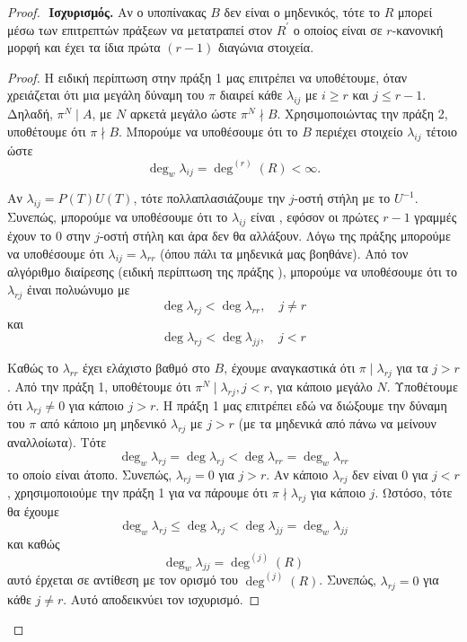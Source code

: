 \begin{proof}
$ $\newline
\textbf{Ισχυρισμός.} Αν ο υποπίνακας $B$ δεν είναι ο μηδενικός, τότε το $R$ μπορεί μέσω των επιτρεπτών πράξεων να μετατραπεί στον $R^\prime$ ο οποίος είναι σε $r$-κανονική μορφή και έχει τα ίδια πρώτα $(r-1)$ διαγώνια στοιχεία.
\begin{proof}
    Η ειδική περίπτωση στην πράξη 1 μας επιτρέπει να υποθέτουμε, όταν χρειάζεται ότι μια μεγάλη δύναμη του $\pi$ διαιρεί κάθε $\lambda_{ij}$ με $i\geq r$ και $j\leq r-1$. Δηλαδή, $\pi^N \mid A$, με $N$ αρκετά μεγάλο ώστε $\pi^N\nmid B$. Χρησιμοποιώντας την πράξη 2, υποθέτουμε ότι $\pi \nmid B$. Μπορούμε να υποθέσουμε ότι το $B$ περιέχει στοιχείο $\lambda_{ij}$ τέτοιο ώστε
    $$\deg_w \lambda_{ij} = \deg^{(r)}(R)<\infty .$$

    \noindent Αν $\lambda_{ij} = P(T)U(T)$, τότε πολλαπλασιάζουμε την $j$-οστή στήλη με το $U^{-1}$. Συνεπώς, μπορούμε να υποθέσουμε ότι το $\lambda_{ij}$ είναι , εφόσον οι πρώτες $r-1$ γραμμές έχουν το 0 στην $j$-οστή στήλη και άρα δεν θα αλλάξουν. Λόγω της πράξης  μπορούμε να υποθέσουμε ότι $\lambda_{ij}  = \lambda_{rr}$ (όπου πάλι τα μηδενικά μας βοηθάνε). Από τον αλγόριθμο διαίρεσης (ειδική περίπτωση της πράξης ), μπορούμε να υποθέσουμε ότι το $\lambda_{rj}$ έιναι πολυώνυμο με
    $$\deg \lambda_{rj} < \deg \lambda_{rr}, \quad j\neq r$$ και 
    $$\deg \lambda_{rj} < \deg \lambda_{jj}, \quad j < r$$

    \noindent Καθώς το $\lambda_{rr}$ έχει ελάχιστο βαθμό  στο $B$, έχουμε αναγκαστικά ότι $\pi \mid \lambda_{rj}$ για τα $j > r$. Από την πράξη 1, υποθέτουμε ότι $\pi^N \mid \lambda_{rj}, j<r$, για κάποιο μεγάλο $N$. Υποθέτουμε ότι $\lambda_{rj} \neq 0$ για κάποιο $j > r$. Η πράξη 1 μας επιτρέπει εδώ να διώξουμε την δύναμη του $\pi$ από κάποιο μη μηδενικό $\lambda_{rj}$ με $j>r$ (με τα μηδενικά από πάνω να μείνουν αναλλοίωτα). Τότε 
    $$\deg_w \lambda_{rj} = \deg \lambda_{rj} < \deg \lambda_{rr} = \deg_w \lambda_{rr}$$ το οποίο είναι άτοπο. Συνεπώς, $\lambda_{rj} = 0$ για $j>r$. Αν κάποιο $\lambda_{rj}$ δεν είναι $0$ για $j<r$, χρησιμοποιούμε την πράξη 1 για να πάρουμε ότι $\pi \nmid \lambda_{rj}$ για κάποιο $j$. Ωστόσο, τότε θα έχουμε
    $$\deg_w \lambda_{rj} \leq \deg \lambda_{rj} < \deg \lambda_{jj} = \deg_w \lambda_{jj}$$
    και καθώς 
    $$\deg_w \lambda_{jj} = \deg^{(j)}(R)$$
    αυτό έρχεται σε αντίθεση με τον ορισμό του $\deg^{(j)}(R)$. Συνεπώς, $\lambda_{rj} = 0$ για κάθε $j\neq r$. Αυτό αποδεικνύει τον ισχυρισμό.
\end{proof}


\end{proof}
